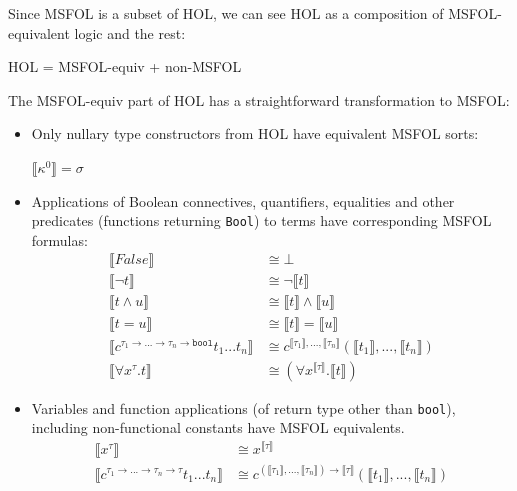 \documentclass{article}
\begin{document}
	Since MSFOL is a subset of 
	HOL, we can see HOL as a 
	composition of 
	MSFOL-equivalent logic 
	and the rest:
	\begin{center}
		HOL = MSFOL-equiv + non-MSFOL 
	\end{center}
	The MSFOL-equiv part of HOL has 
	a straightforward transformation 
	to MSFOL:
	\begin{itemize}
		\item Only nullary type 
		constructors from HOL have
		equivalent MSFOL sorts:
		\begin{center}
			$\llbracket \kappa^{0} 
			\rrbracket = \sigma $
		\end{center}
		\item Applications of 
		Boolean connectives,
		quantifiers, equalities and 
		other predicates (functions 
		returning \texttt{Bool}) to 
		terms have corresponding 
		MSFOL formulas:
		\begin{align*}
		\llbracket False 
		\rrbracket &\cong \bot \\
		\llbracket \neg t \rrbracket 
		&\cong \neg \llbracket t 
		\rrbracket\\
		\llbracket t \land u 
		\rrbracket &\cong \llbracket t 
		\rrbracket \land \llbracket u
		\rrbracket\\
		\llbracket t = u \rrbracket 
		&\cong \llbracket t 
		\rrbracket = \llbracket u
		\rrbracket\\
		\llbracket c^{\tau_1 \to ... 
			\to \tau_n \to \texttt{bool}} 
		t_1 ... t_n \rrbracket &\cong 
		c^{\llbracket \tau_1 \rrbracket, 
			..., \llbracket \tau_n \rrbracket}
		(\llbracket t_1 \rrbracket, ..., 
		\llbracket t_n \rrbracket)\\
		\llbracket \forall x^{\tau}.t 
		\rrbracket &\cong (\forall 
		x^{\llbracket \tau \rrbracket}.
		\llbracket t \rrbracket)
		\end{align*}
		\item Variables and function 
		applications (of return type 
		other than \texttt{bool}), 
		including non-functional 
		constants have MSFOL 
		equivalents.
		\begin{align*}
		\llbracket x^{\tau} 
		\rrbracket &\cong 
		x^{\llbracket \tau \rrbracket}\\
		\llbracket c^{\tau_1 \to ... 
			\to \tau_n \to \tau} 
		t_1 ... t_n \rrbracket &\cong 
		c^{(\llbracket \tau_1 \rrbracket, 
			..., \llbracket \tau_n \rrbracket)
			\to \llbracket \tau \rrbracket}
		(\llbracket t_1 \rrbracket, ..., 
		\llbracket t_n \rrbracket)
		\end{align*}
	\end{itemize}
	
\end{document}
